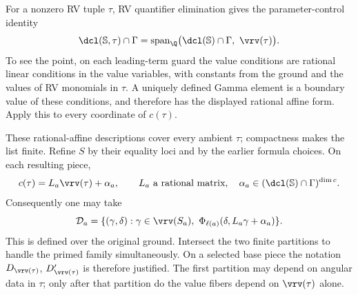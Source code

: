 For a nonzero RV tuple $\tau$, RV quantifier elimination
gives the parameter-control identity
\[
 \dcl(\mathbb S,\tau)\cap\Gamma
 =
 \operatorname{span}_{\Q}
 \bigl(\dcl(\mathbb S)\cap\Gamma,\ \vrv(\tau)\bigr).
\]
To see the point, on each leading-term guard the value
conditions are rational linear conditions in the value
variables, with constants from the ground and the values
of RV monomials in $\tau$.
A uniquely defined Gamma element is a boundary value of
these conditions, and therefore has the displayed rational
affine form.
Apply this to every coordinate of $c(\tau)$.

These rational-affine descriptions cover every ambient
$\tau$; compactness makes the list finite.
Refine $S$ by their equality loci and by the earlier formula
choices. On each resulting piece,
\[
 c(\tau)=L_a\vrv(\tau)+\alpha_a,
 \qquad L_a\text{ a rational matrix},\quad
 \alpha_a\in(\dcl(\mathbb S)\cap\Gamma)^{\dim c}.
\]
Consequently one may take
\[
 \mathcal D_a=
 \{(\gamma,\delta):\gamma\in\vrv(S_a),\
             \Phi_{\ell(a)}(\delta,L_a\gamma+\alpha_a)\}.
\]
This is defined over the original ground.
Intersect the two finite partitions to handle the primed
family simultaneously.
On a selected base piece the notation
$D_{\vrv(\tau)}$, $D'_{\vrv(\tau)}$ is therefore justified.
The first partition may depend on angular data in $\tau$;
only after that partition do the value fibers depend on
$\vrv(\tau)$ alone.
